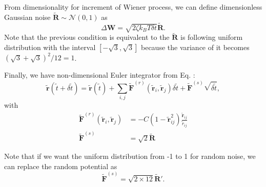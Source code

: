\documentclass[10pt, a4paper]{article}
\begin{document}
From dimensionality for increment of Wiener process, we can define dimensionless Gaussian noise $\tilde{\mathbf{R}}\sim\mathscr{N}(0,1)$  as
\begin{equation}
\Delta \mathbf{W} = \sqrt{2\zeta k_BT\delta t}\tilde{\mathbf{R}}.
\end{equation}
Note that the previous condition is equivalent to the $\tilde{\mathbf{R}}$ is following uniform distribution with the interval $[-\sqrt{3}, \sqrt{3}]$ because the variance of it becomes $(\sqrt{3}+\sqrt{3})^2/12 = 1$. 

Finally, we have non-dimensional Euler integrator from Eq. \label{eq:update_position}:
\begin{equation}
\tilde{\mathbf{r}}(\tilde{t} + \delta \tilde{t}) = \tilde{\mathbf{r}}(\tilde{t}) + \sum_{i,j}\tilde{\mathbf{F}}^{(r)}(\tilde{\mathbf{r}}_i, \tilde{\mathbf{r}}_j)\delta \tilde{t} + \tilde{\mathbf{F}}^{(s)}\sqrt{\delta\tilde{t}},
\end{equation}
with
\begin{align}
\tilde{\mathbf{F}}^{(r)}(\tilde{\mathbf{r}}_i, \tilde{\mathbf{r}}_j) &= -C\left(1-\tilde{\mathbf{r}}_{ij}^2\right)\frac{\tilde{\mathbf{r}}_{ij}}{\tilde{r}_{ij}}\\
\tilde{\mathbf{F}}^{(s)} &= \sqrt{2}\tilde{\mathbf{R}}
\end{align}

Note that if we want the uniform distribution from -1 to 1 for random noise, we can replace the random potential as
\begin{equation}
\tilde{\mathbf{F}}^{(s)} = \sqrt{2\times 12}\tilde{\mathbf{R}}'.
\end{equation}
\end{document}
